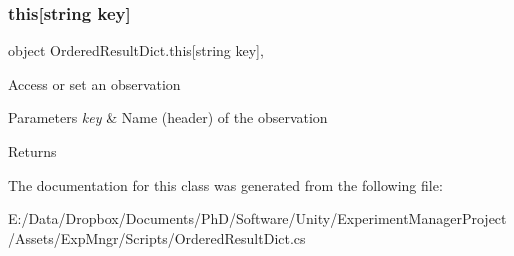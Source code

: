 \subsubsection{\texorpdfstring{this[string key]}{this[string key]}}
{\footnotesize\ttfamily object Ordered\+Result\+Dict.\+this\mbox{[}string key\mbox{]}\hspace{0.3cm}{\ttfamily [get]}, {\ttfamily [set]}}



Access or set an observation 


\begin{DoxyParams}{Parameters}
{\em key} & Name (header) of the observation\\
\hline
\end{DoxyParams}
\begin{DoxyReturn}{Returns}

\end{DoxyReturn}


The documentation for this class was generated from the following file\+:\begin{DoxyCompactItemize}
\item 
E\+:/\+Data/\+Dropbox/\+Documents/\+Ph\+D/\+Software/\+Unity/\+Experiment\+Manager\+Project/\+Assets/\+Exp\+Mngr/\+Scripts/Ordered\+Result\+Dict.\+cs\end{DoxyCompactItemize}
